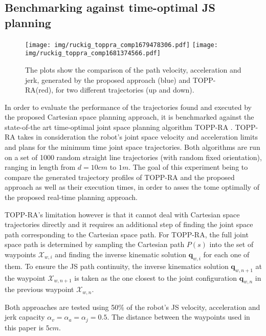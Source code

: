 \subsection{Benchmarking against time-optimal JS planning}

\begin{figure}[!t]
    \centering
    \texttt{[image: img/ruckig\_toppra\_comp1679478306.pdf]}
    \texttt{[image: img/ruckig\_toppra\_comp1681374566.pdf]}
    \caption{The plots show the comparison of the path velocity, acceleration and jerk, generated by the proposed approach (blue) and TOPP-RA(red), for two different trajectories (up and down). }
    \label{fig:comparison_trajectory}
\end{figure}

In order to evaluate the performance of the trajectories found and executed by the proposed Cartesian space planning approach, it is benchmarked against the state-of-the art time-optimal joint space planning algorithm TOPP-RA \cite{Pham2018}. TOPP-RA takes in consideration the robot's joint space velocity and acceleration limits and plans for the minimum time joint space trajectories.
Both algorithms are run on a set of 1000 random straight line trajectories (with random fixed orientation), ranging in length from $d=10cm$ to $1m$. The goal of this experiment being to compare the generated trajectory profiles of TOPP-RA and the proposed approach as well as their execution times, in order to asses the tome optimally of the proposed real-time planning approach. 

TOPP-RA's limitation however is that it cannot deal with Cartesian space trajectories directly and it requires an additional step of finding the joint space path corresponding to the Cartesian space path.  For TOPP-RA, the full joint space path is determined by sampling the Cartesian path $P(s)$ into the set of waypoints $\mathcal{X}_{w,i}$ and finding the inverse kinematic solution $\bm{q}_{w,i}$ for each one of them. To ensure the JS path continuity, the inverse kinematics solution $\bm{q}_{w,n+1}$ at the waypoint $\mathcal{X}_{w,n+1}$ is taken as the one closest to the joint configuration $\bm{q}_{w,n}$ in the previous waypoint $\mathcal{X}_{w,n}$.

Both approaches are tested using 50\% of the robot's JS velocity, acceleration and jerk capacity $\alpha_v\!=\!\alpha_a\!=\!\alpha_j = 0.5$. The distance between the waypoints used in this paper is $5cm$. 



